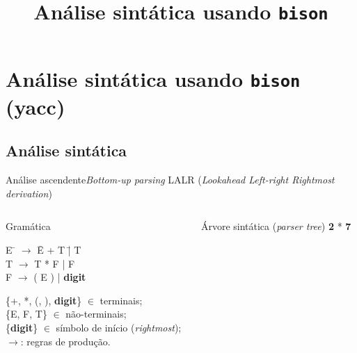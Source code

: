
\title{Análise sintática usando {\tt bison}}
\section{Análise sintática usando {\tt bison} (yacc)}

\frame{\maketitle}

\frame{\tableofcontents}

\subsection{Análise sintática}

\begin{frame}{Análise ascendente}{{\em Bottom-up parsing}}
  LALR ({\it Lookahead Left-right Rightmost derivation\/})

  \begin{columns}
     \begin{column}{.5\textwidth}
      \begin{block}{Gramática}
        \begin{tabbing}
          E \= $\rightarrow$ \= E + T \= | T \\
          T \> $\rightarrow$ \> T * F \> | F\\
          F \> $\rightarrow$ \> ( E ) \> | {\bf digit}\\
        \end{tabbing}
        \{+, *, (, ), {\bf digit}\} $\in$ terminais;\\
        \{E, F, T\} $\in$ não-terminais;\\
        \{{\bf digit}\} $\in$ símbolo de início ({\it rightmost\/});\\
        $\rightarrow$: regras de produção.
      \end{block}
    \end{column}
    \pause
    \begin{column}{.5\textwidth}
      \begin{block}{Árvore sintática ({\it parser tree\/})}
        {\bf 2} * {\bf 7}\\ 
        \small
    \end{block}
    \end{column}
  \end{columns}
\end{frame}

